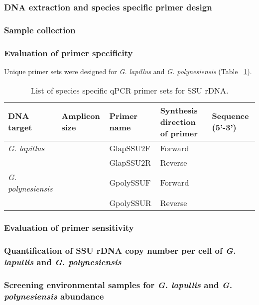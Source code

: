 \documentclass[12pt]{article}
\begin{document}
\subsubsection{DNA extraction and species specific primer design}

\subsubsection{Sample collection}

\subsubsection{Evaluation of primer specificity}
Unique primer sets were designed for \emph{G. lapillus} and \emph{G. polynesiensis} (Table ~\ref{tbl:PrimerTable}).
\FloatBarrier
\begin{table}
\caption{List of species specific  qPCR primer sets for SSU rDNA.}
\label{tbl:PrimerTable}
\begin{tabular}{  | p{2cm} | p{2cm} | p{2cm} | p{2cm} | p{7cm} | }
\hline
\textbf{DNA target} & \textbf{Amplicon size} & \textbf{Primer name} & \textbf{Synthesis direction of primer} & \textbf{Sequence (5'-3')}  \\
  \hline
   \emph{G. lapillus}   & &GlapSSU2F & Forward & \\
   \hline
 & &GlapSSU2R & Reverse & \\
 \hline
\emph{G. polynesiensis}& &GpolySSUF& Forward & \\
 \hline
  & &GpolySSUR & Reverse &   \\
    \hline
 \end{tabular}
\end{table}
\subsubsection{Evaluation of primer sensitivity}

\subsubsection{Quantification of SSU rDNA copy number per cell of \emph{G. lapullis} and \emph{G. polynesiensis}}

\subsubsection{Screening environmental samples for \emph{G. lapullis} and \emph{G. polynesiensis} abundance}
\end{document}
